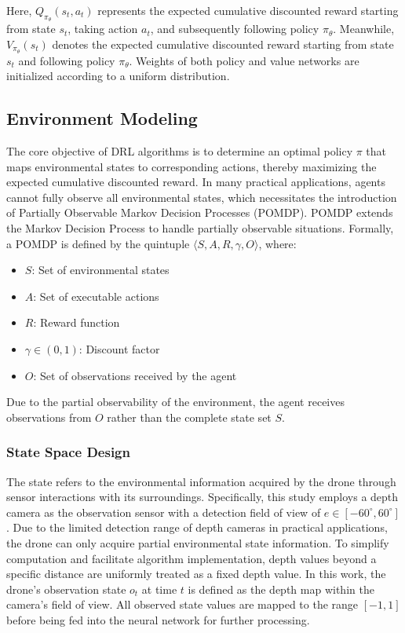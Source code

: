 \documentclass[preprint,12pt,authoryear]{elsarticle}
\begin{document}

Here, \( Q_{\pi_{\theta}}(s_t, a_t) \) represents the expected cumulative discounted reward starting from state \( s_t \), taking action \( a_t \), and subsequently following policy \( \pi_{\theta} \). Meanwhile, \( V_{\pi_{\theta}}(s_t) \) denotes the expected cumulative discounted reward starting from state \( s_t \) and following policy \( \pi_{\theta} \). Weights of both policy and value networks are initialized according to a uniform distribution.


\subsection{Environment Modeling}

The core objective of DRL algorithms is to determine an optimal policy \(\pi\) that maps environmental states to corresponding actions, thereby maximizing the expected cumulative discounted reward. In many practical applications, agents cannot fully observe all environmental states, which necessitates the introduction of Partially Observable Markov Decision Processes (POMDP). POMDP extends the Markov Decision Process to handle partially observable situations. Formally, a POMDP is defined by the quintuple \(\langle S, A, R, \gamma, O \rangle\), where:
\begin{itemize}
    \item \(S\): Set of environmental states
    \item \(A\): Set of executable actions
    \item \(R\): Reward function
    \item \(\gamma \in (0, 1)\): Discount factor
    \item \(O\): Set of observations received by the agent
\end{itemize}
Due to the partial observability of the environment, the agent receives observations from \(O\) rather than the complete state set \(S\).

\subsubsection{State Space Design}

The state refers to the environmental information acquired by the drone through sensor interactions with its surroundings. Specifically, this study employs a depth camera as the observation sensor with a detection field of view of \( e \in [-60^\circ, 60^\circ] \). Due to the limited detection range of depth cameras in practical applications, the drone can only acquire partial environmental state information. To simplify computation and facilitate algorithm implementation, depth values beyond a specific distance are uniformly treated as a fixed depth value. In this work, the drone's observation state \( o_t \) at time \( t \) is defined as the depth map within the camera's field of view. All observed state values are mapped to the range \([-1, 1]\) before being fed into the neural network for further processing.
\end{document}
